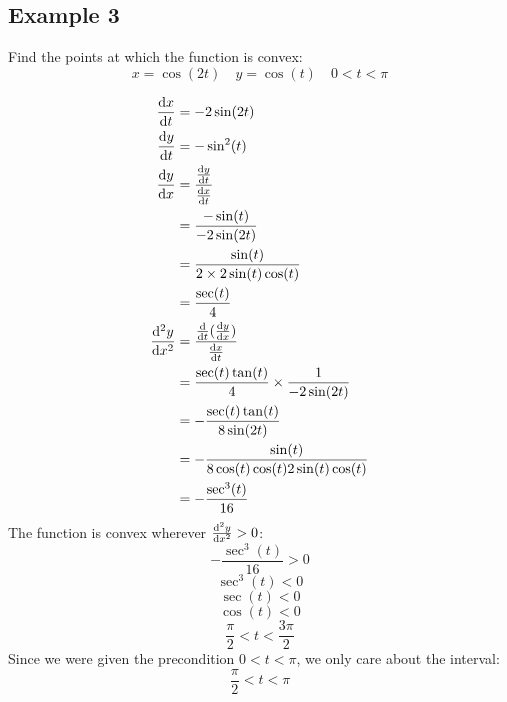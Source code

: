 \documentclass{math}
\begin{document}
\subsection*{Example 3}
Find the points at which the function is convex:
\[ x = \cos(2t) \quad y = \cos(t) \quad 0 < t < \pi \]
\begin{center}
\end{center}
\begin{align*}
  \frac{\mathrm{d}{x}}{\mathrm{d}{t}} &= -2\sin(2t) \\
  \frac{\mathrm{d}{y}}{\mathrm{d}{t}} &= -\sin^{2}(t) \\
  \frac{\mathrm{d}{y}}{\mathrm{d}{x}} &=
    \frac{\frac{\mathrm{d}{y}}{\mathrm{d}{t}}}{\frac{\mathrm{d}{x}}{\mathrm{d}{t}}} \\
  &= \frac{-\sin(t)}{-2\sin(2t)} \\
  &= \frac{\sin(t)}{2\times2\sin(t)\cos(t)} \\
  &= \frac{\sec(t)}{4} \\
  \frac{\mathrm{d^2}{y}}{\mathrm{d}{x}^{2}} &=
    \frac{\frac{\mathrm{d}}{\mathrm{d}{t}}(\frac{\mathrm{d}{y}}{\mathrm{d}{x}})}
      {\frac{\mathrm{d}{x}}{\mathrm{d}{t}}} \\
  &= \frac{\sec(t)\tan(t)}{4}\times\frac{1}{-2\sin(2t)} \\
  &= -\frac{\sec(t)\tan(t)}{8\sin(2t)} \\
  &= -\frac{\sin(t)}{8\cos(t)\cos(t)2\sin(t)\cos(t)} \\
  &= -\frac{\sec^{3}(t)}{16}
\end{align*}
The function is convex wherever \( \frac{\mathrm{d^2}{y}}{\mathrm{d}{x}^{2}} > 0 \):
\[ -\frac{\sec^{3}(t)}{16} > 0 \]
\[ \sec^{3}(t) < 0 \]
\[ \sec(t) < 0 \]
\[ \cos(t) < 0 \]
\[ \frac{\pi}{2} < t < \frac{3\pi}{2} \]
Since we were given the precondition \( 0 < t < \pi \), we only care about the
interval:
\[ \frac{\pi}{2} < t < \pi \]
\end{document}
